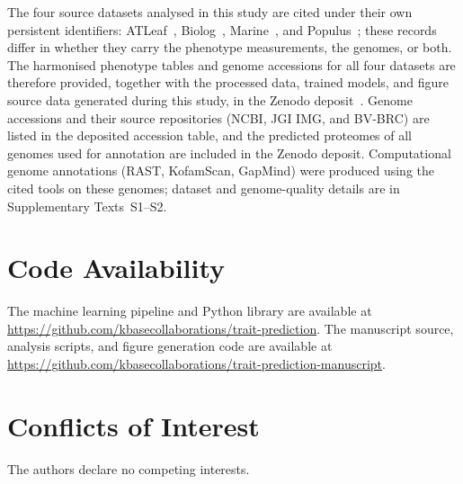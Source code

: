 \begin{refsection}
The four source datasets analysed in this study are cited under their own persistent identifiers: ATLeaf~\cite{Schafer2023-nk}, Biolog~\cite{BiologDatasetCitation}, Marine~\cite{Gralka2023-ft}, and Populus~\cite{PopulusDatasetCitation}; these records differ in whether they carry the phenotype measurements, the genomes, or both.
The harmonised phenotype tables and genome accessions for all four datasets are therefore provided, together with the processed data, trained models, and figure source data generated during this study, in the Zenodo deposit~\cite{ZenodoDeposit}.
Genome accessions and their source repositories (NCBI, JGI IMG, and BV-BRC) are listed in the deposited accession table, and the predicted proteomes of all genomes used for annotation are included in the Zenodo deposit.
Computational genome annotations (RAST, KofamScan, GapMind) were produced using the cited tools on these genomes; dataset and genome-quality details are in Supplementary Texts~S1--S2.

\section*{Code Availability}

The machine learning pipeline and Python library are available at \url{https://github.com/kbasecollaborations/trait-prediction}.
The manuscript source, analysis scripts, and figure generation code are available at \url{https://github.com/kbasecollaborations/trait-prediction-manuscript}.

\section*{Conflicts of Interest}

The authors declare no competing interests.

\newpage
\singlespacing
\printbibliography




\end{refsection}

\ifdefined\splitsupp
\else
  \clearpage
  \begin{refsection}
  
  \newpage
  \printbibliography[title={Supplementary References}]
  \end{refsection}
\fi



